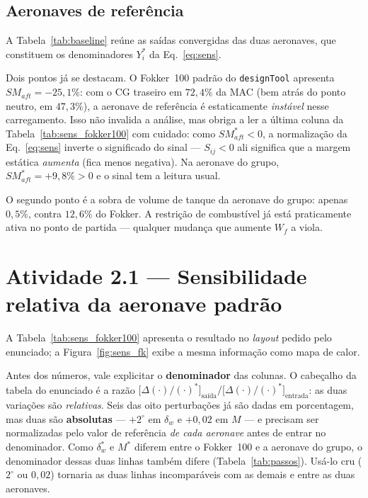 \documentclass[11pt,a4paper]{article}
\newcommand{\code}[1]{\texttt{\small #1}}
\begin{document}
\subsection{Aeronaves de refer\^encia}

A Tabela~\ref{tab:baseline} re\'une as sa\'idas convergidas das duas aeronaves,
que constituem os denominadores $Y_i^{*}$ da Eq.~\eqref{eq:sens}.

\begin{table}[H]
\centering
\caption{Sa\'idas de \code{analyze} nas duas aeronaves de refer\^encia.}
\label{tab:baseline}
\small

\end{table}

Dois pontos j\'a se destacam. O Fokker~100 padr\~ao do \code{designTool}
apresenta $SM_{aft} = -25{,}1\%$: com o CG traseiro em $72{,}4\%$ da MAC (bem
atr\'as do ponto neutro, em $47{,}3\%$), a aeronave de refer\^encia \'e
estaticamente \emph{inst\'avel} nesse carregamento. Isso n\~ao invalida a
an\'alise, mas obriga a ler a \'ultima coluna da Tabela~\ref{tab:sens_fokker100} com
cuidado: como $SM_{aft}^{*} < 0$, a normaliza\c{c}\~ao da Eq.~\eqref{eq:sens}
inverte o significado do sinal --- $S_{ij} < 0$ ali significa que a margem
est\'atica \emph{aumenta} (fica menos negativa). Na aeronave do grupo,
$SM_{aft}^{*} = +9{,}8\% > 0$ e o sinal tem a leitura usual.

O segundo ponto \'e a sobra de volume de tanque da aeronave do grupo:
apenas $0{,}5\%$, contra $12{,}6\%$ do Fokker. A restri\c{c}\~ao de
combust\'ivel j\'a est\'a praticamente ativa no ponto de partida --- qualquer
mudan\c{c}a que aumente $W_f$ a viola.

\section{Atividade 2.1 --- Sensibilidade relativa da aeronave padr\~ao}

A Tabela~\ref{tab:sens_fokker100} apresenta o resultado no \emph{layout} pedido
pelo enunciado; a Figura~\ref{fig:sens_fk} exibe a mesma informa\c{c}\~ao como
mapa de calor.

Antes dos n\'umeros, vale explicitar o \textbf{denominador} das colunas. O
cabe\c{c}alho da tabela do enunciado \'e a raz\~ao
$\big[\Delta(\cdot)/(\cdot)^{*}\big]_{\text{sa\'ida}}
 \big/ \big[\Delta(\cdot)/(\cdot)^{*}\big]_{\text{entrada}}$: as duas
varia\c{c}\~oes s\~ao \emph{relativas}. Seis das oito perturba\c{c}\~oes j\'a
s\~ao dadas em porcentagem, mas duas s\~ao \textbf{absolutas} --- $+2^\circ$ em
$\delta_w$ e $+0{,}02$ em $M$ --- e precisam ser normalizadas pelo valor de
refer\^encia \emph{de cada aeronave} antes de entrar no denominador. Como
$\delta_w^{*}$ e $M^{*}$ diferem entre o Fokker~100 e a aeronave do grupo, o
denominador dessas duas linhas tamb\'em difere (Tabela~\ref{tab:passos}).
Us\'a-lo cru ($2^\circ$ ou $0{,}02$) tornaria as duas linhas incompar\'aveis com
as demais e entre as duas aeronaves.
\end{document}
